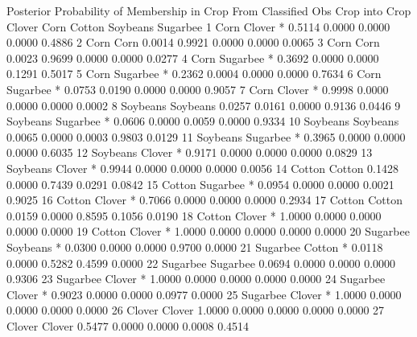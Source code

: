 \documentclass{article}
\begin{document}
\begin{Woutput}
                       Posterior Probability of Membership in Crop
       From        Classified
Obs    Crop        into Crop       Clover        Corn      Cotton    Soybeans    Sugarbee
  1    Corn        Clover   *      0.5114      0.0000      0.0000      0.0000      0.4886
  2    Corn        Corn            0.0014      0.9921      0.0000      0.0000      0.0065
  3    Corn        Corn            0.0023      0.9699      0.0000      0.0000      0.0277
  4    Corn        Sugarbee *      0.3692      0.0000      0.0000      0.1291      0.5017
  5    Corn        Sugarbee *      0.2362      0.0004      0.0000      0.0000      0.7634
  6    Corn        Sugarbee *      0.0753      0.0190      0.0000      0.0000      0.9057
  7    Corn        Clover   *      0.9998      0.0000      0.0000      0.0000      0.0002
  8    Soybeans    Soybeans        0.0257      0.0161      0.0000      0.9136      0.0446
  9    Soybeans    Sugarbee *      0.0606      0.0000      0.0059      0.0000      0.9334
 10    Soybeans    Soybeans        0.0065      0.0000      0.0003      0.9803      0.0129
 11    Soybeans    Sugarbee *      0.3965      0.0000      0.0000      0.0000      0.6035
 12    Soybeans    Clover   *      0.9171      0.0000      0.0000      0.0000      0.0829
 13    Soybeans    Clover   *      0.9944      0.0000      0.0000      0.0000      0.0056
 14    Cotton      Cotton          0.1428      0.0000      0.7439      0.0291      0.0842
 15    Cotton      Sugarbee *      0.0954      0.0000      0.0000      0.0021      0.9025
 16    Cotton      Clover   *      0.7066      0.0000      0.0000      0.0000      0.2934
 17    Cotton      Cotton          0.0159      0.0000      0.8595      0.1056      0.0190
 18    Cotton      Clover   *      1.0000      0.0000      0.0000      0.0000      0.0000
 19    Cotton      Clover   *      1.0000      0.0000      0.0000      0.0000      0.0000
 20    Sugarbee    Soybeans *      0.0300      0.0000      0.0000      0.9700      0.0000
 21    Sugarbee    Cotton   *      0.0118      0.0000      0.5282      0.4599      0.0000
 22    Sugarbee    Sugarbee        0.0694      0.0000      0.0000      0.0000      0.9306
 23    Sugarbee    Clover   *      1.0000      0.0000      0.0000      0.0000      0.0000
 24    Sugarbee    Clover   *      0.9023      0.0000      0.0000      0.0977      0.0000
 25    Sugarbee    Clover   *      1.0000      0.0000      0.0000      0.0000      0.0000
 26    Clover      Clover          1.0000      0.0000      0.0000      0.0000      0.0000
 27    Clover      Clover          0.5477      0.0000      0.0000      0.0008      0.4514

\end{Woutput}
\end{document}
